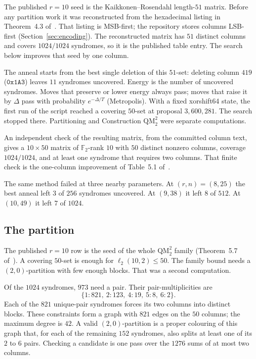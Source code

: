 \documentclass[11pt,a4paper]{article}
\newcommand{\FF}{\mathbb{F}}
\newcommand{\ellr}{\ell_2}
\begin{document}
The published $r=10$ seed is the Kaikkonen--Rosendahl length-$51$
matrix. Before any partition work it was reconstructed from the
hexadecimal listing in Theorem~4.3 of~\cite{DMP2025}. That listing is
MSB-first; the repository stores columns LSB-first
(Section~\ref{sec:encoding}). The reconstructed matrix has $51$
distinct columns and covers $1024/1024$ syndromes, so it is the
published table entry. The search below improves that seed by one
column.

The anneal starts from the best single deletion of this $51$-set:
deleting column $419$ ($\mathtt{0x1A3}$) leaves $11$ syndromes
uncovered. Energy is the number of uncovered syndromes. Moves that
preserve or lower energy always pass; moves that raise it by $\Delta$ pass
with probability $e^{-\Delta/T}$ (Metropolis). With a fixed xorshift64
state, the first run of the script reached a covering $50$-set at
proposal $3{,}600{,}281$. The search stopped there. Partitioning and
Construction $\mathrm{QM}_2^2$ were separate computations.

An independent check of the resulting matrix, from the committed
column text, gives a $10\times 50$ matrix of $\FF_2$-rank $10$ with
$50$ distinct nonzero columns, coverage $1024/1024$, and at least one
syndrome that requires two columns. That finite check is the
one-column improvement of Table~5.1 of~\cite{DMP2025}.

The same method failed at three nearby parameters. At $(r,n)=(8,25)$
the best anneal left $3$ of $256$ syndromes uncovered. At $(9,38)$ it
left $8$ of $512$. At $(10,49)$ it left $7$ of $1024$.

\subsection{The partition}

The published $r=10$ row is the seed of the whole
$\mathrm{QM}_2^2$ family (Theorem~5.7 of~\cite{DMP2025}). A covering
$50$-set is enough for $\ellr(10,2)\le 50$. The family bound needs a
$(2,0)$-partition with few enough blocks. That was a second
computation.

Of the $1024$ syndromes, $973$ need a pair. Their pair-multiplicities
are
\[
\{1{:}821,\ 2{:}123,\ 4{:}19,\ 5{:}8,\ 6{:}2\}.
\]
Each of the $821$ unique-pair syndromes forces its two columns into
distinct blocks. These constraints form a graph with $821$ edges on
the $50$ columns; the maximum degree is $42$. A valid
$(2,0)$-partition is a proper colouring of this graph that, for each
of the remaining $152$ syndromes, also splits at least one of its $2$
to $6$ pairs. Checking a candidate is one pass over the $1276$ sums of
at most two columns.
\end{document}
